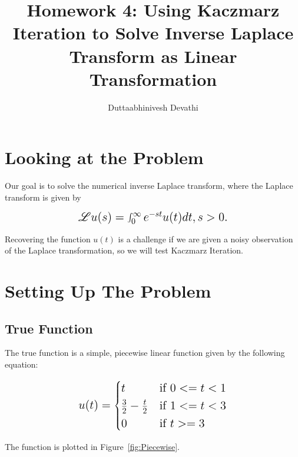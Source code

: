 \documentclass{article}
\title{Homework 4: Using Kaczmarz Iteration to Solve Inverse Laplace Transform as Linear Transformation}
\author{Duttaabhinivesh Devathi}
\begin{document}
\maketitle
\tableofcontents
\section{Looking at the Problem}

Our goal is to solve the numerical inverse Laplace transform, where the Laplace transform is given by

\begin{equation}
\mbox{\Large\(
\mathscr{L} u(s) = \int_0^{\infty} e^{-st}u(t)dt,   s > 0.
\)}
\end{equation}

Recovering the function $u(t)$ is a challenge if we are given a noisy observation of the Laplace transformation, so we will test Kaczmarz Iteration.

\section{Setting Up The Problem}

\subsection{True Function}

The true function is a simple, piecewise linear function given by the following equation:

\begin{equation}
\mbox{\Large\(
  u(t) =
  \begin{cases}
  t & \text{if $ 0 <= t < 1$} \\
  \frac{3}{2} - \frac{t}{2} & \text{if $1 <= t < 3$} \\
  0 & \text{if $t >= 3$}
  \end{cases}
  \)}
\end{equation}

The function is plotted in Figure~\ref{fig:Piecewise}.
\end{document}
